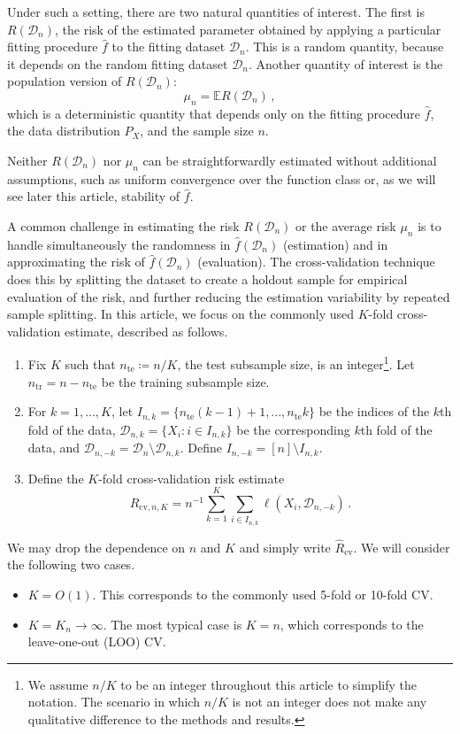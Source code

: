 \documentclass[11pt]{article}
\theoremstyle{plain}
\newcommand{\cv}{{\mathrm{cv}}}
\newcommand{\tr}{{\mathrm{tr}}}
\newcommand{\te}{{\mathrm{te}}}
\newcommand{\D}{{\mathcal{D}}}
\begin{document}
Under such a setting, there are two natural quantities of interest.
The first is $R(\D_n)$, the risk of the estimated parameter obtained by applying a particular fitting procedure $\hat f$ to the fitting dataset $\D_n$. This is a random quantity, because it depends on the random fitting dataset $\D_n$.
Another quantity of interest is the population version of $R(\D_n)$:
\begin{equation}\label{eq:2.1-mu_n}
\mu_n=\mathbb E R(\D_n)\,,    
\end{equation}
which is a deterministic quantity that depends only on the fitting procedure $\hat f$, the data distribution $P_X$, and the sample size $n$.

Neither $R(\D_n)$ nor $\mu_n$ can be straightforwardly estimated without additional assumptions, such as uniform convergence over the function class or, as we will see later this article, stability of $\hat f$.  

A common challenge in estimating the risk $R(\D_n)$ or the average risk $\mu_n$ is to handle simultaneously the randomness in $\hat f(\D_n)$ (estimation) and in approximating the risk of $\hat f(\D_n)$ (evaluation). The cross-validation technique does this by splitting the dataset to create a holdout sample for empirical evaluation of the risk, and further reducing the estimation variability by repeated sample splitting.  In this article, we focus on the commonly used
$K$-fold cross-validation estimate, described as follows.
\begin{enumerate}
    \item Fix $K$ such that $n_\te\coloneqq n/K$, the test subsample size, is an integer\footnote{We assume $n/K$ to be an integer throughout this article to simplify the notation.  The scenario in which $n/K$ is not an integer does not make any qualitative difference to the methods and results.}.  Let $n_\tr=n-n_\te$ be the training subsample size.
   \item  For $k=1,...,K$, let $I_{n,k}=\{n_\te(k-1)+1,...,n_\te k\}$ be the indices of the $k$th fold of the data, $\D_{n,k}=\{X_i:i\in I_{n,k}\}$ be the corresponding $k$th fold of the data, and $\D_{n,-k}=\D_n\setminus \D_{n,k}$.   Define $I_{n,-k}=[n]\setminus I_{n,k}$.
\item Define the $K$-fold cross-validation risk estimate
\begin{equation}\label{eq:2.1-cv-risk-est}
\hat R_{\cv,n,K} = n^{-1}\sum_{k=1}^K \sum_{i\in I_{n,k}}\ell(X_i,\D_{n,-k})\,.    
\end{equation}
\end{enumerate}
We may drop the dependence on $n$ and $K$ and simply write $\hat R_{\cv}$.  We will consider the following two cases.
\begin{itemize}
    \item $K=O(1)$. This corresponds to the commonly used 5-fold or 10-fold CV.
    \item $K=K_n\rightarrow\infty$. The most typical case is $K=n$, which corresponds to the leave-one-out (LOO) CV.
\end{itemize}
\end{document}
